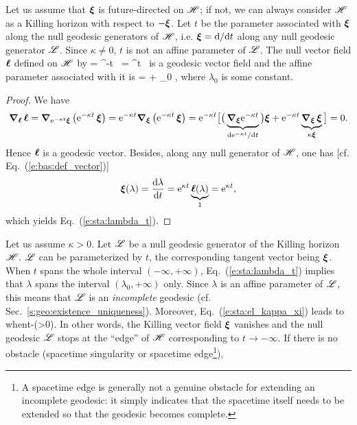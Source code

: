 Let us assume that $\bm{\xi}$ is future-directed on $\mathscr{H}$; if not, we can
always consider $\mathscr{H}$ as a Killing horizon with respect to $-\bm{\xi}$.
Let $t$ be the parameter
associated with $\bm{\xi}$ along the null geodesic generators of $\mathscr{H}$, i.e.
$\bm{\xi} = \mathrm{d}/\mathrm{d} t$ along any null geodesic generator $\mathscr{L}$.
Since $\kappa\not=0$, $t$ is not an affine parameter of $\mathscr{L}$.
The null vector field $\bm{\ell}$ defined on $\mathscr{H}$ by
\be \label{e:sta:el_kappa_xi}
    \wl = ^{-\kappa t} \, \w{\xi} \quad \iff\quad
    \w{\xi} = ^{\kappa t} \, \wl
\ee
is a geodesic vector field and the affine parameter associated with it is
\be \label{e:sta:lambda_t}
    \lambda =  + \lambda_0 ,
\ee
where $\lambda_0$ is some constant.
\begin{proof}
We have
\[
\bm{\nabla}_{\bm{\ell}}\, \bm{\ell} = \bm{\nabla}_{\mathrm{e}^{-\kappa t} \bm{\xi}} \left( \mathrm{e}^{-\kappa t} \, \bm{\xi} \right) = \mathrm{e}^{-\kappa t} \bm{\nabla}_{\bm{\xi}} \left( \mathrm{e}^{-\kappa t} \, \bm{\xi} \right)
= \mathrm{e}^{-\kappa t} \big[ \big( \underbrace{\bm{\nabla}_{\bm{\xi}} \mathrm{e}^{-\kappa t}}_{\mathrm{d} \mathrm{e}^{-\kappa t}/\mathrm{d} t} \big) \bm{\xi}
    + \mathrm{e}^{-\kappa t} \underbrace{\bm{\nabla}_{\bm{\xi}}\, \bm{\xi}}_{\kappa\bm{\xi}}
    \big] = 0 .
\]
Hence $\bm{\ell}$ is a geodesic vector. Besides, along any null generator of $\mathscr{H}$,
one has [cf. Eq.~(\ref{e:bas:def_vector})]
\[
    \bm{\xi}(\lambda) = \frac{\mathrm{d}\lambda}{\mathrm{d} t} = \mathrm{e}^{\kappa t}
    \underbrace{\bm{\ell}(\lambda)}_{1} = \mathrm{e}^{\kappa t} ,
\]
which yields Eq.~(\ref{e:sta:lambda_t}).
\end{proof}
Let us assume $\kappa>0$. Let $\mathscr{L}$ be a null geodesic generator of the Killing
horizon $\mathscr{H}$. $\mathscr{L}$ can be parameterized by $t$, the corresponding
tangent vector being $\bm{\xi}$. When $t$ spans the whole interval $(-\infty,+\infty)$,
Eq.~(\ref{e:sta:lambda_t}) implies that $\lambda$ spans the
interval $(\lambda_0,+\infty)$ only. Since $\lambda$ is an affine parameter of $\mathscr{L}$,
this means that $\mathscr{L}$ is an \emph{incomplete} geodesic (cf. Sec.~\ref{s:geo:existence_uniqueness}).
Moreover, Eq.~(\ref{e:sta:el_kappa_xi}) leads to
\be \label{e:sta:xi_zero_t_inf}
    \w{\xi}  \quad\mbox{when}\quad t\rightarrow -\infty \qquad (\kappa>0).
\ee
In other words, the Killing vector field $\bm{\xi}$ vanishes and
the null geodesic $\mathscr{L}$ stops at the ``edge'' of $\mathscr{H}$ corresponding to
$t\rightarrow -\infty$.
If there is no obstacle (spacetime singularity or spacetime edge\footnote{A spacetime edge is generally not a genuine obstacle for extending an incomplete geodesic: it simply indicates
that the spacetime itself needs to be extended so that the geodesic becomes complete.}),
